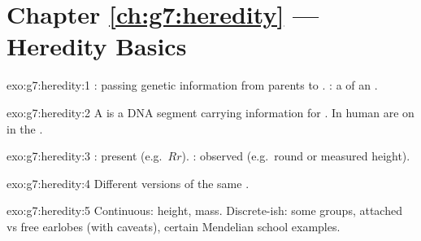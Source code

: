 \section*{Chapter \ref{ch:g7:heredity} --- Heredity Basics}

\begin{solution}{exo:g7:heredity:1}
: passing genetic information from parents to . :
a  of an .
\end{solution}

\begin{solution}{exo:g7:heredity:2}
A  is a DNA segment carrying information for . In human 
  are on  in the .
\end{solution}

\begin{solution}{exo:g7:heredity:3}
:  present (e.g.\ $Rr$). : observed  (e.g.\
round  or measured height).
\end{solution}

\begin{solution}{exo:g7:heredity:4}
Different versions of the same .
\end{solution}

\begin{solution}{exo:g7:heredity:5}
Continuous: height, mass. Discrete-ish: some  groups, attached vs
free earlobes (with caveats), certain Mendelian school examples.
\end{solution}

